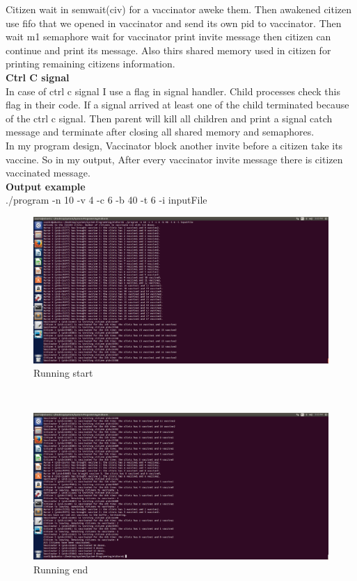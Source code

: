 \documentclass{article}
\begin{document}
Citizen wait in semwait(civ) for a vaccinator aweke them. Then awakened citizen use fifo that we opened in vaccinator and send its own pid to vaccinator. Then wait m1 semaphore wait for vaccinator print invite message then citizen can continue and print its message. Also thirs shared memory used in citizen for printing remaining citizens information.
\\
\textbf{Ctrl C signal} \\
In case of ctrl c signal I use a flag in signal handler. Child processes check this flag in their code. If a signal arrived at least one of the child terminated because of the ctrl c signal. Then parent will kill all children and print a signal catch message and terminate after closing all shared memory and semaphores.
\\
\newpage
In my program design, Vaccinator block another invite before a citizen take its vaccine. So in my output, After every vaccinator invite message there is citizen vaccinated message.\\
\textbf{Output example} \\
./program -n 10 -v 4 -c 6 -b 40 -t 6 -i inputFile
\begin{figure}[h!]
\centering
\includegraphics[scale=0.3]{run1.png}
\caption{Running start}
\label{fig:citizen}
\end{figure}
\\
\begin{figure}[h!]
\centering
\includegraphics[scale=0.3]{run2.png}
\caption{Running end}
\label{fig:citizen}
\end{figure}
\end{document}
